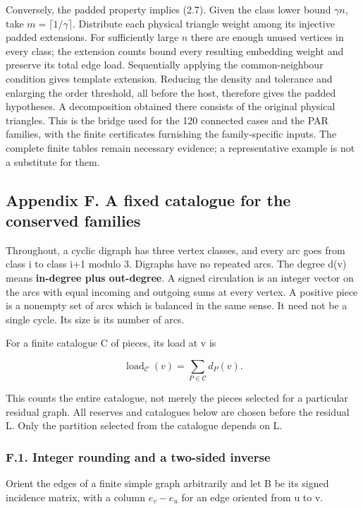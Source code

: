 \documentclass[english,11pt,a4paper]{article}
\newcounter{none}
\begin{document}
Conversely, the padded property implies (2.7). Given the class lower bound \(\gamma n\), take \(m=\lceil1/\gamma\rceil\). Distribute each physical triangle weight among its injective padded extensions. For sufficiently large \(n\) there are enough unused vertices in every class; the extension counts bound every resulting embedding weight and preserve its total edge load. Sequentially applying the common-neighbour condition gives template extension. Reducing the density and tolerance and enlarging the order threshold, all before the host, therefore gives the padded hypotheses. A decomposition obtained there consists of the original physical triangles. This is the bridge used for the 120 connected cases and the PAR families, with the finite certificates furnishing the family-specific inputs. The complete finite tables remain necessary evidence; a representative example is not a substitute for them.

\subsection{Appendix F. A fixed catalogue for the conserved families}\label{appendix-f.-a-fixed-catalogue-for-the-conserved-families}

Throughout, a cyclic digraph has three vertex classes, and every arc goes from class i to class i+1 modulo 3. Digraphs have no repeated arcs. The degree d(v) means \textbf{in-degree plus out-degree}. A signed circulation is an integer vector on the arcs with equal incoming and outgoing sums at every vertex. A positive piece is a nonempty set of arcs which is balanced in the same sense. It need not be a single cycle. Its size is its number of arcs.

For a finite catalogue C of pieces, its load at v is

\[\operatorname{load}_{\mathcal C}(v)=\sum_{P\in\mathcal C}d_P(v).\]

This counts the entire catalogue, not merely the pieces selected for a particular residual graph. All reserves and catalogues below are chosen before the residual L. Only the partition selected from the catalogue depends on L.

\subsubsection{F.1. Integer rounding and a two-sided inverse}\label{f.1.-integer-rounding-and-a-two-sided-inverse}

Orient the edges of a finite simple graph arbitrarily and let B be its signed incidence matrix, with a column \(e_{v}-e_{u}\) for an edge oriented from u to v.
\end{document}
